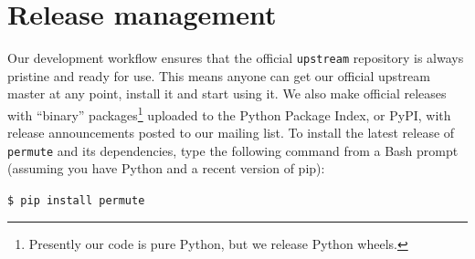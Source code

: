 \section{\label{sec:release}Release management}

Our development workflow ensures that the official \texttt{upstream} repository
is always pristine and ready for use.  This means anyone can get our official
upstream master at any point, install it and start using it.  We also 
make official releases with ``binary'' packages\footnote{Presently our code is pure
Python, but we release Python wheels.}
uploaded to the Python Package Index, or PyPI, with release announcements posted
to our mailing list.
To install the latest release of \texttt{permute} and its dependencies, type
the following command from a Bash prompt (assuming you have Python and a recent version of pip): 

\texttt{\$ pip install permute}
